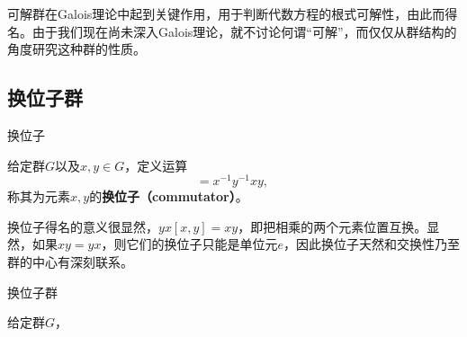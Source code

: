 


可解群在Galois理论中起到关键作用，用于判断代数方程的根式可解性，由此而得名。由于我们现在尚未深入Galois理论，就不讨论何谓“可解”，而仅仅从群结构的角度研究这种群的性质。



\subsection{换位子群}


\begin{definition}{换位子}

给定群$G$以及$x, y\in G$，定义运算
\begin{equation}
[x, y] = x^{-1}y^{-1}xy,~
\end{equation}
称其为元素$x, y$的\textbf{换位子（commutator）}。

\end{definition}


换位子得名的意义很显然，$yx[x, y]=xy$，即把相乘的两个元素位置互换。显然，如果$xy=yx$，则它们的换位子只能是单位元$e$，因此换位子天然和交换性乃至群的中心有深刻联系。


\begin{definition}{换位子群}

给定群$G$，

\end{definition}































